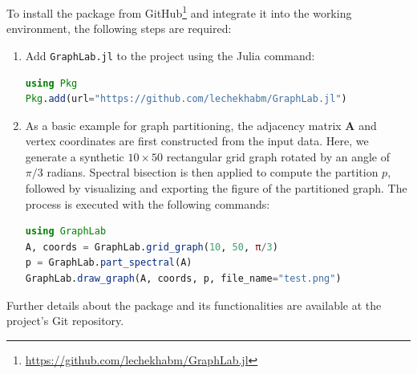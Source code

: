 % 
    To install the package from GitHub\footnote{\url{https://github.com/lechekhabm/GraphLab.jl}} and integrate it into the working environment, the following steps are required:

    \begin{enumerate}
        \item Add \texttt{GraphLab.jl} to the project using the Julia command:
\begin{lstlisting}[language = Julia]
using Pkg
Pkg.add(url="https://github.com/lechekhabm/GraphLab.jl")
\end{lstlisting}
        \item As a basic example for graph partitioning, the adjacency matrix $\mathbf{A}$ and vertex coordinates
        are first constructed from the input data.
        Here, we generate a synthetic $10 \times 50$ rectangular grid graph rotated by an angle of $\pi/3$ radians.
        Spectral bisection is then applied to compute the partition $p$, followed by visualizing and exporting the figure of the partitioned graph. The process is executed with the following commands:
        \newline
\begin{lstlisting}[language = Julia]
using GraphLab
A, coords = GraphLab.grid_graph(10, 50, π/3)
p = GraphLab.part_spectral(A)
GraphLab.draw_graph(A, coords, p, file_name="test.png")
\end{lstlisting}

    \end{enumerate}
Further details about the package and its functionalities are available at the project's Git repository.
    




